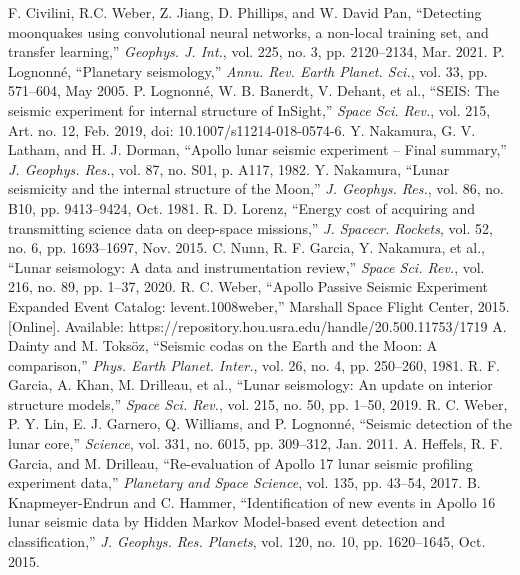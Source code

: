 \documentclass[conference]{IEEEtran}
\begin{document}
\begin{thebibliography}{00}
     F. Civilini, R.C. Weber, Z. Jiang, D. Phillips, and W. David Pan, ``Detecting moonquakes using convolutional neural networks, a non-local training set, and transfer learning,'' \emph{Geophys. J. Int.}, vol. 225, no. 3, pp. 2120--2134, Mar. 2021.
      P. Lognonné, ``Planetary seismology,'' \emph{Annu. Rev. Earth Planet. Sci.}, vol. 33, pp. 571--604, May 2005.
     P. Lognonné, W. B. Banerdt, V. Dehant, et al., ``SEIS: The seismic experiment for internal structure of InSight,'' \emph{Space Sci. Rev.}, vol. 215, Art. no. 12, Feb. 2019, doi: 10.1007/s11214-018-0574-6.
     Y. Nakamura, G. V. Latham, and H. J. Dorman, ``Apollo lunar seismic experiment – Final summary,'' \emph{J. Geophys. Res.}, vol. 87, no. S01, p. A117, 1982.
     Y. Nakamura, ``Lunar seismicity and the internal structure of the Moon,'' \emph{J. Geophys. Res.}, vol. 86, no. B10, pp. 9413--9424, Oct. 1981.
     R. D. Lorenz, ``Energy cost of acquiring and transmitting science data on deep-space missions,'' \emph{J. Spacecr. Rockets}, vol. 52, no. 6, pp. 1693--1697, Nov. 2015.
     C. Nunn, R. F. Garcia, Y. Nakamura, et al., ``Lunar seismology: A data and instrumentation review,'' \emph{Space Sci. Rev.}, vol. 216, no. 89, pp. 1--37, 2020.
     R. C. Weber, ``Apollo Passive Seismic Experiment Expanded Event Catalog: levent.1008weber,'' Marshall Space Flight Center, 2015. [Online]. Available: https://repository.hou.usra.edu/handle/20.500.11753/1719
     A. Dainty and M. Toksöz, ``Seismic codas on the Earth and the Moon: A comparison,'' \emph{Phys. Earth Planet. Inter.}, vol. 26, no. 4, pp. 250--260, 1981.
     R. F. Garcia, A. Khan, M. Drilleau, et al., ``Lunar seismology: An update on interior structure models,'' \emph{Space Sci. Rev.}, vol. 215, no. 50, pp. 1--50, 2019.
     R. C. Weber, P. Y. Lin, E. J. Garnero, Q. Williams, and P. Lognonné, ``Seismic detection of the lunar core,'' \emph{Science}, vol. 331, no. 6015, pp. 309--312, Jan. 2011.
     A. Heffels, R. F. Garcia, and M. Drilleau, ``Re-evaluation of Apollo 17 lunar seismic profiling experiment data,'' \emph{Planetary and Space Science}, vol. 135, pp. 43--54, 2017.
     B. Knapmeyer-Endrun and C. Hammer, ``Identification of new events in Apollo 16 lunar seismic data by Hidden Markov Model-based event detection and classification,'' \emph{J. Geophys. Res. Planets}, vol. 120, no. 10, pp. 1620--1645, Oct. 2015.

\end{thebibliography}
\end{document}
